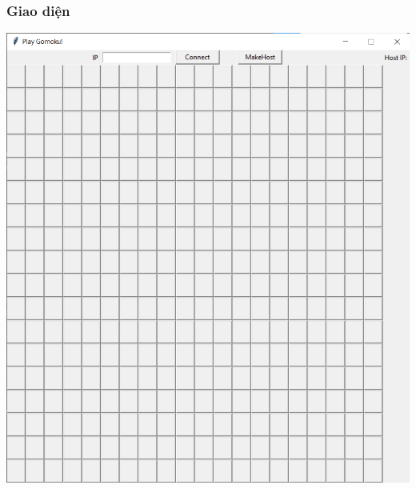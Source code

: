 \documentclass[a4paper]{article}
\begin{document}
    \subsubsection{Giao diện}
    \begin{center}
        \includegraphics[width=1\textwidth]{images/PlayWithPlayer.png}
    \end{center}
\end{document}
